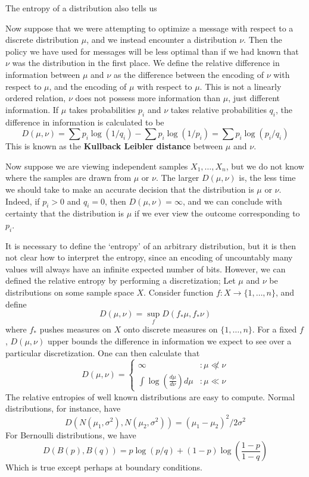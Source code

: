 The entropy of a distribution also tells us 

Now suppose that we were attempting to optimize a message with respect to a discrete distribution $\mu$, and we instead encounter a distribution $\nu$. Then the policy we have used for messages will be less optimal than if we had known that $\nu$ was the distribution in the first place. We define the relative difference in information between $\mu$ and $\nu$ as the difference between the encoding of $\nu$ with respect to $\mu$, and the encoding of $\mu$ with respect to $\mu$. This is not a linearly ordered relation, $\nu$ does not possess more information than $\mu$, just different information. If $\mu$ takes probabilities $p_i$ and $\nu$ takes relative probabilities $q_i$, the difference in information is calculated to be
%
\[ D(\mu, \nu) = \sum p_i \log(1/q_i) - \sum p_i \log(1/p_i) = \sum p_i \log(p_i/q_i) \]
%
This is known as the {\bf Kullback Leibler distance} between $\mu$ and $\nu$.

Now suppose we are viewing independent samples $X_1, \dots, X_n$, but we do not know where the samples are drawn from $\mu$ or $\nu$. The larger $D(\mu, \nu)$ is, the less time we should take to make an accurate decision that the distribution is $\mu$ or $\nu$. Indeed, if $p_i > 0$ and $q_i = 0$, then $D(\mu, \nu) = \infty$, and we can conclude with certainty that the distribution is $\mu$ if we ever view the outcome corresponding to $p_i$.

It is necessary to define the `entropy' of an arbitrary distribution, but it is then not clear how to interpret the entropy, since an encoding of uncountably many values will always have an infinite expected number of bits. However, we can defined the relative entropy by performing a discretization; Let $\mu$ and $\nu$ be distributions on some sample space $X$. Consider function $f: X \to \{ 1, \dots, n \}$, and define
%
\[ D(\mu, \nu) = \sup_f D(f_* \mu, f_* \nu) \]
%
where $f_*$ pushes measures on $X$ onto discrete measures on $\{ 1, \dots, n \}$. For a fixed $f$, $D(\mu, \nu)$ upper bounds the difference in information we expect to see over a particular discretization. One can then calculate that
%
\[ D(\mu, \nu) = \begin{cases} \infty &: \mu \not \ll \nu \\ \int \log(\frac{d\mu}{d\nu}) d\mu &: \mu \ll \nu \end{cases} \]
%
The relative entropies of well known distributions are easy to compute. Normal distributions, for instance, have
%
\[ D(N(\mu_1, \sigma^2), N(\mu_2, \sigma^2)) = (\mu_1 - \mu_2)^2/2\sigma^2 \]
%
For Bernoulli distributions, we have
%
\[ D(B(p), B(q)) = p \log(p/q) + (1-p)\log \left( \frac{1-p}{1-q} \right) \]
%
Which is true except perhaps at boundary conditions.


